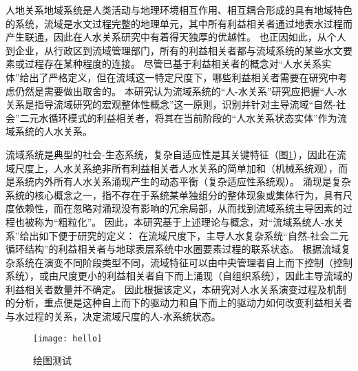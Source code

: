 
人地关系地域系统是人类活动与地理环境相互作用、相互耦合形成的具有地域特色的系统\cite{tan2021}，流域是水文过程完整的地理单元，其中所有利益相关者通过地表水过程而产生联通，因此在人水关系研究中有着得天独厚的优越性。
也正因如此，从个人到企业，从行政区到流域管理部门，所有的利益相关者都与流域系统的某些水文要素或过程存在某种程度的连接。
尽管已基于利益相关者的概念对“人水关系实体”给出了严格定义，但在流域这一特定尺度下，哪些利益相关者需要在研究中考虑仍然是需要做出取舍的。
本研究认为流域系统的“人-水关系”研究应把握“人-水关系是指导流域研究的宏观整体性概念”这一原则，识别并针对主导流域“自然-社会”二元水循环模式的利益相关者，将其在当前阶段的“人水关系状态实体”作为流域系统的人水关系。

流域系统是典型的社会-生态系统，复杂自适应性是其关键特征（图\ref{ch2:fig:complexity}），因此在流域尺度上，人水关系绝非所有利益相关者人水关系的简单加和（机械系统观），而是系统内外所有人水关系涌现产生的动态平衡（复杂适应性系统观）。
涌现是复杂系统的核心概念之一，指不存在于系统某单独组分的整体现象或集体行为，具有尺度依赖性，而在忽略对涌现没有影响的冗余局部，从而找到流域系统主导因素的过程也被称为“粗粒化”\cite{mitchell2011}。
因此，本研究基于上述理论与概念，对“流域系统人-水关系”给出如下便于研究的定义：
在流域尺度下，主导人水复杂系统“自然-社会二元循环结构”的利益相关者与地球表层系统中水圈要素过程的联系状态。
根据流域复杂系统在演变不同阶段类型不同，流域特征可以由中央管理者自上而下控制（控制系统），或由尺度更小的利益相关者自下而上涌现（自组织系统），因此主导流域的利益相关者数量并不确定。
因此根据该定义，本研究对人水关系演变过程及机制的分析，重点便是这种自上而下的驱动力和自下而上的驱动力如何改变利益相关者与水过程的关系，决定流域尺度的人-水系统状态。

\begin{figure}[htb] %
    \texttt{[image: hello]}
    \caption[流域系统作为社会-生态系统的概念图式]{绘图测试}\label{ch2:fig:complexity}
\end{figure}
